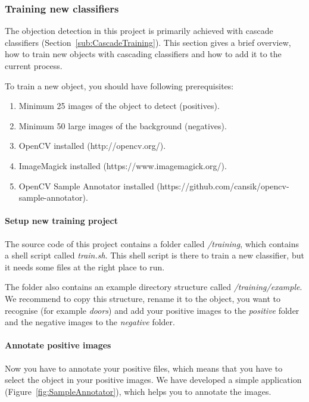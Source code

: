 \subsubsection{Training new classifiers}

The objection detection in this project is primarily achieved with cascade classifiers (Section~\ref{sub:CascadeTraining}). This section gives a brief overview, how to train new objects with cascading classifiers and how to add it to the current process.

To train a new object, you should have following prerequisites:

\renewcommand{\labelenumi}{\alph{enumi})}
\begin{enumerate}
    \item Minimum 25 images of the object to detect (positives).
    \item Minimum 50 large images of the background (negatives).
    \item OpenCV installed (http://opencv.org/).
    \item ImageMagick installed (https://www.imagemagick.org/).
    \item OpenCV Sample Annotator installed (https://github.com/cansik/opencv-sample-annotator).
\end{enumerate}

\paragraph{Setup new training project}

The source code of this project contains a folder called \textit{/training}, which contains a shell script called \textit{train.sh}. This shell script is there to train a new classifier, but it needs some files at the right place to run.

The folder also contains an example directory structure called \textit{/training/example}. We recommend to copy this structure, rename it to the object, you want to recognise (for example \textit{doors}) and add your positive images to the \textit{positive} folder and the negative images to the \textit{negative} folder.

\paragraph{Annotate positive images}

Now you have to annotate your positive files, which means that you have to select the object in your positive images. We have developed a simple application (Figure~\ref{fig:SampleAnnotator}), which helps you to annotate the images.

